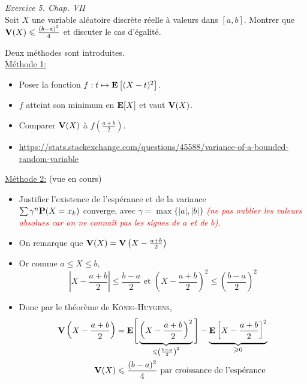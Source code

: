 \begin{exercice}    
    \emph{Exercice 5. Chap. VII}\\
    Soit $X$ une variable aléatoire discrète réelle à valeurs dans $[a, b]$. Montrer que $\V(X) \leqslant \frac{(b-a)^2}{4}$ et discuter le cas d'égalité.
\end{exercice}

\begin{solution}
    Deux méthodes sont introduites.\\
    \underline{Méthode 1:}
    \begin{itemize}
        \item Poser la fonction $f:t \mapsto \E \left[(X-t)^2 \right]$.
        \item $f$ atteint son minimum en $\E[X]$ et vaut $\V(X)$. 
        \item Comparer $\V(X)$ à $f \left( \frac{a + b}{2} \right)$.
        \item \url{https://stats.stackexchange.com/questions/45588/variance-of-a-bounded-random-variable}
    \end{itemize}
    
    \underline{Méthode 2:} (vue en cours)
    \begin{itemize}
        \item Justifier l'existence de l'espérance et de la variance\\
        $\sum \gamma^n \P(X=x_k)$ converge, avec $\boxed{\gamma = \max \{ |a|, |b| \}}$ \textcolor{red}{\emph{(ne pas oublier les valeurs absolues  car on ne connaît pas les signes de $a$ et de $b$)}}.
        \item On remarque que $\V(X) = \V \left( X - \frac{a+b}{2} \right)$
        \item Or comme $a \leqslant X \leqslant b$, $$\displaystyle \left| X - \frac{a+b}{2}\right| \leqslant \frac{b-a}{2} \text{ et } \displaystyle \left( X - \frac{a+b}{2} \right)^2 \leqslant \left(\frac{b-a}{2}\right)^2$$
        \item Donc par le théorème de \textsc{König}-\textsc{Huygens}, 
        \begin{align*}
            \V \left(X - \frac{a+b}{2} \right) &= \E \Bigg[ \underbrace{\left(X - \frac{a+b}{2} \right)^2}_{\leqslant \left( \frac{b-a}{2} \right)^2} \Bigg] - \underbrace{\E \left[X-\frac{a+b}{2} \right]^2}_{\geqslant 0} \\
            \V(X) &\leqslant \frac{(b-a)^2}{4} \text{ par croissance de l'espérance}
        \end{align*}
    \end{itemize}
    

\end{solution}
